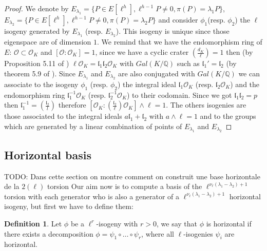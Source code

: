 \documentclass{article}
\newcommand{\todo}[1]{{\color{red}TODO: #1}}
\theoremstyle{plain}
\theoremstyle{definition}
\newtheorem{defi}[thm]{Definition}
\theoremstyle{remark}
\begin{document}
\begin{proof}
We denote by $E_{\lambda_1}=\{P \in E[\ell^h], \ell^{h-1}P \neq 0, \pi(P)=\lambda_1P\}$, $E_{\lambda_2}=\{P \in E[\ell^h], \ell^{h-1}P \neq 0, \pi(P)=\lambda_2P\}$ and consider $\phi_1$(resp. $\phi_2$) the $\ell$isogeny generated by $E_{\lambda_1}$ (resp. $E_{\lambda_2}$). This isogeny is unique since those eigenspace are of dimension $1$. %
We remind that we have the endomorphism ring of $E$: $\mathcal{O} \subset \mathcal{O}_K $ and $[\mathcal{O}:\mathcal{O}_K] =1$, since we have a cyclic crater $\left( \frac{d_K}{\ell} \right)=1$ then (by Proposition 5.11 of \cite{Cox89} )  $\ell \mathcal{O}_K=\mathfrak{l}_1\mathfrak{l}_2\mathcal{O}_K$ with $Gal(K/\mathbb{Q})$ such as $\mathfrak{l}_1'=\mathfrak{l}_2$ (by theorem 5.9 of \cite{Cox89}). Since $E_{\lambda_1}$ and $E_{\lambda_2}$ are also conjugated with $Gal(K/\mathbb{Q})$ we can associate to the isogeny $\phi_1$ (resp. $\phi_2$)  the integral ideal $\mathfrak{l}_1\mathcal{O}_K$ (resp. $\mathfrak{l}_2\mathcal{O}_K$) and the endomorphism ring $\mathfrak{l}_1^{-1}\mathcal{O}_K$ (resp. $\mathfrak{l}_2^{-1}\mathcal{O}_K$) to their codomain. Since we got $\mathfrak{l}_1\mathfrak{l}_2=p$ then $\mathfrak{l}_1^{-1}=\left( \frac{\mathfrak{l}_2}{l} \right)$ therefore $[\mathcal{O}_K:\left( \frac{\mathfrak{l}_2}{\ell} \right)\mathcal{O}_K]\wedge \ell =1$. The others isogenies are those associated to the integral ideals $a  \mathfrak{l}_1 + \mathfrak{l}_2$ with $a \wedge \ell =1$ and to the groups which are generated by a linear combination of points of $E_{\lambda_1}$ and $E_{\lambda_2}$
\end{proof}


\subsection{Horizontal basis}
\todo{Dans cette section on montre comment on construit une base horizontale de la $2(\ell)$ torsion}
Our aim now is to compute  a basis of the $\ell^{\nu_{\ell}(\lambda_1-\lambda_2)+1}$ torsion with each generator who is also a generator of a $\ell^{\nu_{\ell}(\lambda_1-\lambda_2)+1}$ horizontal isogeny, but first we have to define them:

\begin{defi}%
Let $\phi$ be a $\ell^r$-isogeny with $r>0$, we say that $\phi$ is horizontal  if there exists a decomposition $\phi = \psi_1 \circ … \circ \psi_r$, where all $\ell$-isogenies $\psi_i$ are horizontal.
\end{defi}
\end{document}
